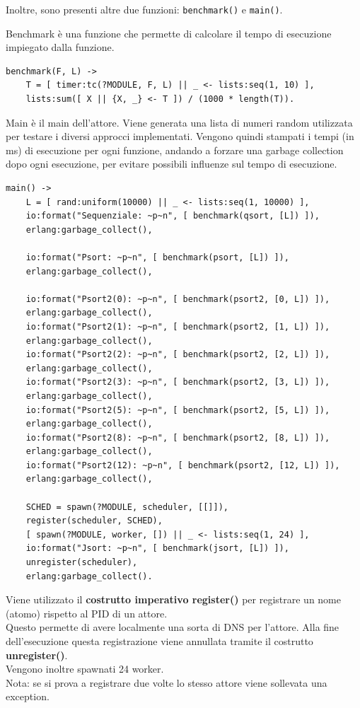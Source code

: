 \documentclass{article}
\begin{document}
Inoltre, sono presenti altre due funzioni: \texttt{benchmark()} e \texttt{main()}.

Benchmark è una funzione che permette di calcolare il tempo di esecuzione impiegato dalla funzione.
\begin{tcolorbox}
\begin{verbatim}
benchmark(F, L) ->
    T = [ timer:tc(?MODULE, F, L) || _ <- lists:seq(1, 10) ],
    lists:sum([ X || {X, _} <- T ]) / (1000 * length(T)).
\end{verbatim}
\end{tcolorbox}

Main è il main dell'attore. Viene generata una lista di numeri random utilizzata per testare i diversi approcci implementati. Vengono quindi stampati i tempi (in ms) di esecuzione per ogni funzione, andando a forzare una garbage collection dopo ogni esecuzione, per evitare possibili influenze sul tempo di esecuzione.
\begin{tcolorbox}
\begin{verbatim}
main() -> 
    L = [ rand:uniform(10000) || _ <- lists:seq(1, 10000) ],
    io:format("Sequenziale: ~p~n", [ benchmark(qsort, [L]) ]),
    erlang:garbage_collect(),

    io:format("Psort: ~p~n", [ benchmark(psort, [L]) ]),
    erlang:garbage_collect(),

    io:format("Psort2(0): ~p~n", [ benchmark(psort2, [0, L]) ]),
    erlang:garbage_collect(),
    io:format("Psort2(1): ~p~n", [ benchmark(psort2, [1, L]) ]),
    erlang:garbage_collect(),
    io:format("Psort2(2): ~p~n", [ benchmark(psort2, [2, L]) ]),
    erlang:garbage_collect(),
    io:format("Psort2(3): ~p~n", [ benchmark(psort2, [3, L]) ]),
    erlang:garbage_collect(),
    io:format("Psort2(5): ~p~n", [ benchmark(psort2, [5, L]) ]),
    erlang:garbage_collect(),
    io:format("Psort2(8): ~p~n", [ benchmark(psort2, [8, L]) ]),
    erlang:garbage_collect(),
    io:format("Psort2(12): ~p~n", [ benchmark(psort2, [12, L]) ]),
    erlang:garbage_collect(),

    SCHED = spawn(?MODULE, scheduler, [[]]),
    register(scheduler, SCHED),                                 
    [ spawn(?MODULE, worker, []) || _ <- lists:seq(1, 24) ],
    io:format("Jsort: ~p~n", [ benchmark(jsort, [L]) ]),
    unregister(scheduler),
    erlang:garbage_collect().
\end{verbatim}
\end{tcolorbox}
Viene utilizzato il \textbf{costrutto imperativo register()} per registrare un nome (atomo) rispetto al PID di un attore.\\
Questo permette di avere localmente una sorta di DNS per l'attore. Alla fine dell'esecuzione questa registrazione viene annullata tramite il costrutto \textbf{unregister()}.\\
Vengono inoltre spawnati 24 worker.\\
Nota: se si prova a registrare due volte lo stesso attore viene sollevata una exception.
\end{document}
